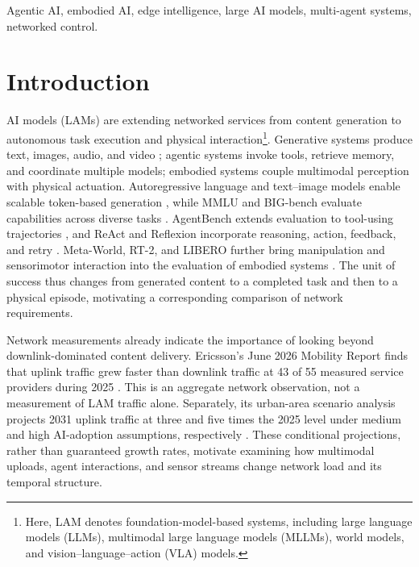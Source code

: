 \documentclass[letterpaper,journal]{IEEEtran}
\begin{document}
\begin{IEEEkeywords}
Agentic AI, embodied AI, edge intelligence, large AI models, multi-agent
systems, networked control.
\end{IEEEkeywords}

\section{Introduction}
\label{sec:introduction}
 AI models (LAMs) are extending networked services from
content generation to autonomous task execution and physical interaction\footnote{Here, LAM denotes foundation-model-based systems,
including large language models (LLMs), multimodal large language models
(MLLMs), world models, and vision--language--action (VLA) models. }.
Generative systems produce text, images, audio, and video
\cite{nvidiagenai}; agentic systems invoke tools, retrieve memory, and
coordinate multiple models; embodied systems couple multimodal perception
with physical actuation. 
Autoregressive language and text--image models enable
scalable token-based generation \cite{gpt3,dalle}, while MMLU and BIG-bench
evaluate capabilities across diverse tasks \cite{mmlu,bigbench}. AgentBench
extends evaluation to tool-using trajectories \cite{agentbench}, and ReAct
and Reflexion incorporate reasoning, action, feedback, and retry
\cite{react,reflexion}. Meta-World, RT-2, and LIBERO further bring
manipulation and sensorimotor interaction into the evaluation of embodied
systems \cite{metaworld,rt2,libero}. The unit of success thus changes from
generated content to a completed task and then to a physical episode,
motivating a corresponding comparison of network requirements.

Network measurements already indicate the importance of looking beyond
downlink-dominated content delivery. Ericsson's June 2026 Mobility Report
finds that uplink traffic grew faster than downlink traffic at 43 of 55
measured service providers during 2025 \cite{ericssonuplink2026}. This is
an aggregate network observation, not a measurement of LAM traffic alone.
Separately, its urban-area scenario analysis projects 2031 uplink traffic
at three and five times the 2025 level under medium and high AI-adoption
assumptions, respectively \cite{ericssonuplink2026}. These conditional
projections, rather than guaranteed growth rates, motivate examining how
multimodal uploads, agent interactions, and sensor streams change network
load and its temporal structure.
\end{document}
